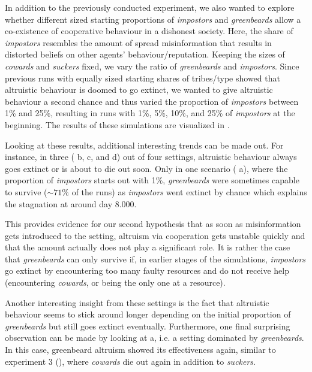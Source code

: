 \documentclass[sigconf]{acmart}
\newcommand{\cowards}{\textit{cowards}\xspace}
\newcommand{\suckers}{\textit{suckers}\xspace}
\newcommand{\impostors}{\textit{impostors}\xspace}
\newcommand{\greenbeards}{\textit{greenbeards}\xspace}
\begin{document}
    In addition to the previously conducted experiment, we also wanted to explore whether different sized starting proportions of \impostors and \greenbeards allow a co-existence of cooperative behaviour in a dishonest society.
    Here, the share of \impostors resembles the amount of spread misinformation that results in distorted beliefs on other agents' behaviour/reputation.
    Keeping the sizes of \cowards and \suckers fixed, we vary the ratio of \greenbeards and \impostors.
    Since previous runs with equally sized starting shares of tribes/type showed that altruistic behaviour is doomed to go extinct, we wanted to give altruistic behaviour a second chance and thus varied the proportion of \impostors between 1\% and 25\%, resulting in runs with 1\%, 5\%, 10\%, and 25\% of \impostors at the beginning.
    The results of these simulations are visualized in .

    Looking at these results, additional interesting trends can be made out.
    For instance, in three ( b, c, and d) out of four settings, altruistic behaviour always goes extinct or is about to die out soon.
    Only in one scenario ( a), where the proportion of \impostors starts out with 1\%, \greenbeards were sometimes capable to survive ($\sim 71\%$ of the runs) as \impostors went extinct by chance which explains the stagnation at around day 8.000.

    This provides evidence for our second hypothesis that as soon as misinformation gets introduced to the setting, altruism via cooperation gets unstable quickly and that the amount actually does not play a significant role.
    It is rather the case that \greenbeards can only survive if, in earlier stages of the simulations, \impostors go extinct by encountering too many faulty resources and do not receive help (encountering \cowards, or being the only one at a resource).

    Another interesting insight from these settings is the fact that altruistic behaviour seems to stick around longer depending on the initial proportion of \greenbeards but still goes extinct eventually.
    Furthermore, one final surprising observation can be made by looking at  a, i.e. a setting dominated by \greenbeards.
    In this case, greenbeard altruism showed its effectiveness again, similar to experiment 3 (), where \cowards die out again in addition to \suckers.
\end{document}

